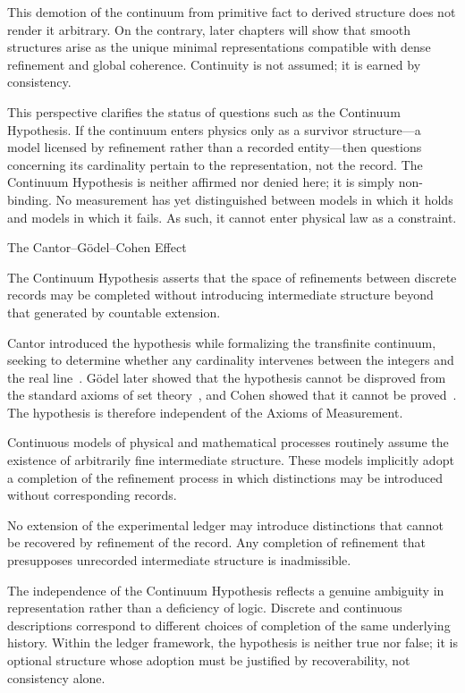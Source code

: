 This demotion of the continuum from primitive fact to derived structure does not
render it arbitrary. On the contrary, later chapters will show that smooth
structures arise as the unique minimal representations compatible with dense
refinement and global coherence. Continuity is not assumed; it is earned by
consistency.

This perspective clarifies the status of questions such as the Continuum
Hypothesis. If the continuum enters physics only as a survivor structure—a model
licensed by refinement rather than a recorded entity—then questions concerning
its cardinality pertain to the representation, not the record. The Continuum
Hypothesis is neither affirmed nor denied here; it is simply non-binding. No
measurement has yet distinguished between models in which it holds and models
in which it fails. As such, it cannot enter physical law as a constraint.

\begin{phenom}{The Cantor--G\"odel--Cohen Effect~\cite{cantor1895,cohen1963,godel1940}}
\label{ph:ch}

\PhStatement
The Continuum Hypothesis asserts that the space of refinements between
discrete records may be completed without introducing intermediate structure
beyond that generated by countable extension.

\PhOrigin
Cantor introduced the hypothesis while formalizing the transfinite continuum,
seeking to determine whether any cardinality intervenes between the integers
and the real line~\cite{cantor1895}. Gödel later showed that the hypothesis 
cannot be disproved from the standard axioms of set theory~\cite{godel1940}, and 
Cohen showed that it cannot be
proved~\cite{cohen1963}. The hypothesis is therefore independent of the Axioms 
of Measurement.

\PhObservation
Continuous models of physical and mathematical processes routinely assume the
existence of arbitrarily fine intermediate structure. These models implicitly
adopt a completion of the refinement process in which distinctions may be
introduced without corresponding records.

\PhConstraint
No extension of the experimental ledger may introduce distinctions
that cannot be recovered by refinement of the record. Any
completion of refinement that presupposes unrecorded intermediate structure is
inadmissible.

\PhConsequence
The independence of the Continuum Hypothesis reflects a genuine ambiguity in
representation rather than a deficiency of logic. Discrete and continuous
descriptions correspond to different choices of completion of the
same underlying history. Within the ledger framework, the hypothesis is neither
true nor false; it is optional structure whose adoption must be justified by
recoverability, not consistency alone.
\end{phenom}



